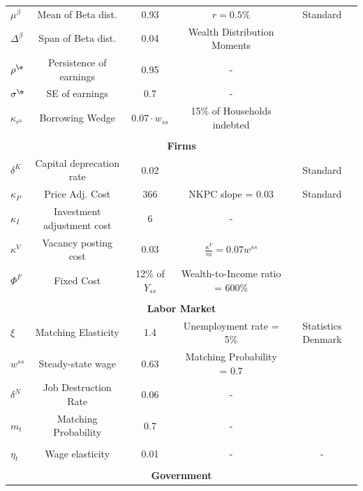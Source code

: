 \begin{table}[H]
{\begin{threeparttable}
{\begin{tabular}{lcccc}
$\mu^\beta$ & Mean of Beta dist. & 0.93 & $r=0.5\%$ & Standard \\ 
$\Delta^\beta$ & Span of Beta dist. & 0.04 & Wealth Distribution Moments & \citet{balestra2018inequalities} \\ 
$\rho^\e$ & Persistence of earnings & 0.95 & - & \citet{floden2001idiosyncratic} \\ 
$\sigma^\e$ & SE of earnings & 0.7 & - & \citet{floden2001idiosyncratic} \\ 
$\kappa_{r^a}$ & Borrowing Wedge & $ 0.07 \cdot w_{ss}$ & 15\% of Households indebted  & \citet{kaplan2018monetary} \\ 
\multicolumn{5}{c}{} \\ 
\multicolumn{5}{c}{\textbf{Firms}} \\
\midrule
$\delta^K$ & Capital deprecation rate & 0.02  &   & Standard \\ 
$\kappa_P$ & Price Adj. Cost & 366  & NKPC slope = 0.03  & Standard  \\ 
$\kappa_I$ & Investment adjustment cost & 6  & -  & \citet{pedersen2013drives}  \\ 
$\kappa^V$ & Vacancy posting cost &  0.03 & $\frac{\kappa^{V}}{m}=0.07w^{ss}$ & \citet{christiano2016unemployment} \\ 
$\Phi^{F}$ & Fixed Cost &  12\% of $Y_{ss}$ & Wealth-to-Income ratio = 600\% & \citet{NB_wealth} \\ 
\multicolumn{5}{c}{} \\ 
\multicolumn{5}{c}{\textbf{Labor Market}} \\
\midrule
$\xi$ & Matching Elasticity & 1.4 & Unemployment rate = 5\% & Statistics Denmark \\ 
$w^{ss}$  & Steady-state wage & 0.63 &  Matching Probability = 0.7  & \citet{christiano2016unemployment} \\
$\delta^N$ & Job Destruction Rate & 0.06  & -  & \citet{hobijn2009job} \\ 
$m_t$ & Matching Probability & 0.7  & -  & \makecell{\citet{den2000job}, \\ \citet{ravenna2008vacancies} }  \\ 
$\eta_t$ & Wage elasticity  & 0.01  & -  & -  \\ 
\multicolumn{5}{c}{} \\ 
\multicolumn{5}{c}{\textbf{Government}} \\

\end{tabular}}
\end{threeparttable}}
\end{table}
